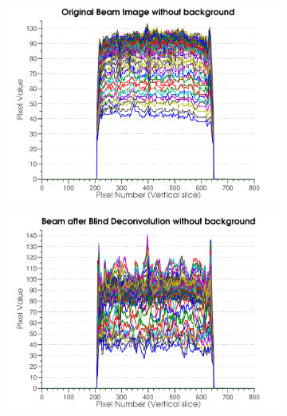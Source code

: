 \begin{figure}
\begin{subfigure}[b]{0.45\textwidth}
                \centering
                \includegraphics[width=\textwidth]{figures/beam/fig_beam_orig_cut.pdf}
                \caption{}
                \label{figallbeams3}
        \end{subfigure}
				\qquad
        \begin{subfigure}[b]{0.45\textwidth}
                \centering
                \includegraphics[width=\textwidth]{figures/beam/fig_beam_blind_cut.pdf}
                \caption{}
                \label{figallbeams4}
        \end{subfigure}
				\\
				\begin{subfigure}[b]{0.45\textwidth}
                \centering

\end{subfigure}
\end{figure}
